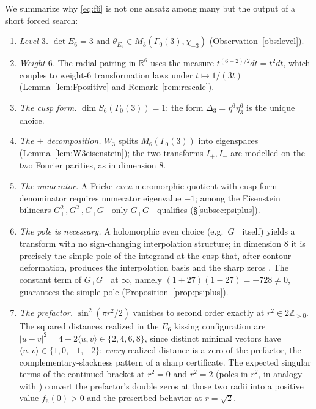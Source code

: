 \documentclass[11pt,reqno]{amsart}
\theoremstyle{plain}
\theoremstyle{definition}
\theoremstyle{remark}
\newcommand{\R}{\mathbb{R}}
\newcommand{\Z}{\mathbb{Z}}
\newcommand{\Dthree}{\Delta_{3}}
\newcommand{\Ip}{I_{+}}
\newcommand{\Imm}{I_{-}}
\begin{document}
We summarize why \eqref{eq:f6} is not one ansatz among many but the
output of a short forced search:

\begin{enumerate}
\item \emph{Level $3$.}  $\det E_6=3$ and
$\theta_{E_6}\in M_3(\Gamma_0(3),\chi_{-3})$
(Observation~\ref{obs:level}).
\item \emph{Weight $6$.}  The radial pairing in $\R^6$ uses the
measure $t^{(6-2)/2}dt=t^2dt$, which couples to weight-$6$
transformation laws under $t\mapsto1/(3t)$
(Lemma~\ref{lem:Fpositive} and Remark~\ref{rem:rescale}).
\item \emph{The cusp form.}  $\dim S_6(\Gamma_0(3))=1$: the form
$\Dthree=\eta^6\eta_3^6$ is the unique choice.
\item \emph{The $\pm$ decomposition.}  $W_3$ splits
$M_6(\Gamma_0(3))$ into eigenspaces (Lemma~\ref{lem:W3eisenstein});
the two transforms $\Ip,\Imm$ are modelled on the two Fourier
parities, as in dimension $8$.
\item \emph{The numerator.}  A Fricke-\emph{even} meromorphic
quotient with cusp-form denominator requires numerator eigenvalue
$-1$; among the Eisenstein bilinears $G_+^2,G_-^2,G_+G_-$ only
$G_+G_-$ qualifies (\S\ref{subsec:psiplus}).
\item \emph{The pole is necessary.}  A holomorphic even choice
(e.g.\ $G_+$ itself) yields a transform with no sign-changing
interpolation structure; in dimension $8$ it is precisely the simple
pole of the integrand at the cusp that, after contour deformation,
produces the interpolation basis and the sharp zeros
\cite{Viazovska2017,Cohn2017}.  The constant term of $G_+G_-$ at
$\infty$, namely $(1+27)(1-27)=-728\ne0$, guarantees the simple pole
(Proposition~\ref{prop:psiplus}).
\item \emph{The prefactor.}  $\sin^2(\pi r^2/2)$ vanishes to second
order exactly at $r^2\in2\Z_{>0}$.  The squared distances realized in
the $E_6$ kissing configuration are $|u-v|^2=4-2\langle u,v\rangle\in
\{2,4,6,8\}$, since distinct minimal vectors have
$\langle u,v\rangle\in\{1,0,-1,-2\}$: \emph{every} realized distance is a
zero of the prefactor, the complementary-slackness pattern of a sharp
certificate.  The expected singular terms of the continued bracket at
$r^2=0$ and $r^2=2$ (poles in $r^2$, in analogy with
\cite[\S7]{Viazovska2017}) convert the prefactor's double zeros at
those two radii into a positive value $f_6(0)>0$ and the prescribed
behavior at $r=\sqrt2$.
\end{enumerate}
\end{document}
